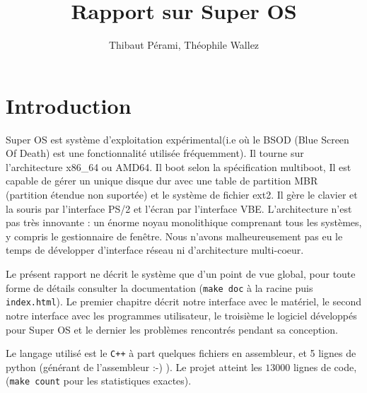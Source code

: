 \documentclass[12pt]{report}
\title{Rapport sur Super OS}
\author{Thibaut Pérami, Théophile Wallez}
\begin{document}
\maketitle

\tableofcontents

\chapter*{Introduction}

Super OS est système d'exploitation expérimental(i.e où le BSOD (Blue Screen Of
Death) est une fonctionnalité utilisée fréquemment). Il tourne sur
l'architecture x86\_64 ou AMD64. Il boot selon la spécification multiboot,
Il est capable de gérer un unique disque dur avec une table de partition MBR
(partition étendue non suportée) et le système de fichier ext2. Il gère le
clavier et la souris par l'interface PS/2 et l'écran par l'interface VBE.
L'architecture n'est pas très innovante : un énorme noyau monolithique comprenant
tous les systèmes, y compris le gestionnaire de fenêtre. Nous n'avons
malheureusement pas eu le temps de développer d'interface réseau ni
d'architecture multi-coeur.

Le présent rapport ne décrit le système que d'un point de vue global, pour toute
forme de détails consulter la documentation (\verb$make doc$ à la racine puis
\verb$index.html$). Le premier chapitre décrit notre interface avec le matériel,
le second notre interface avec les programmes utilisateur, le troisième le
logiciel développés pour Super OS et le dernier les problèmes rencontrés pendant
sa conception.

Le langage utilisé est le \verb$C++$ à part quelques fichiers en assembleur, et
5 lignes de python (générant de l'assembleur :-) ). Le projet atteint les $13 000$
lignes de code, (\verb$make count$ pour les statistiques exactes).
\end{document}
